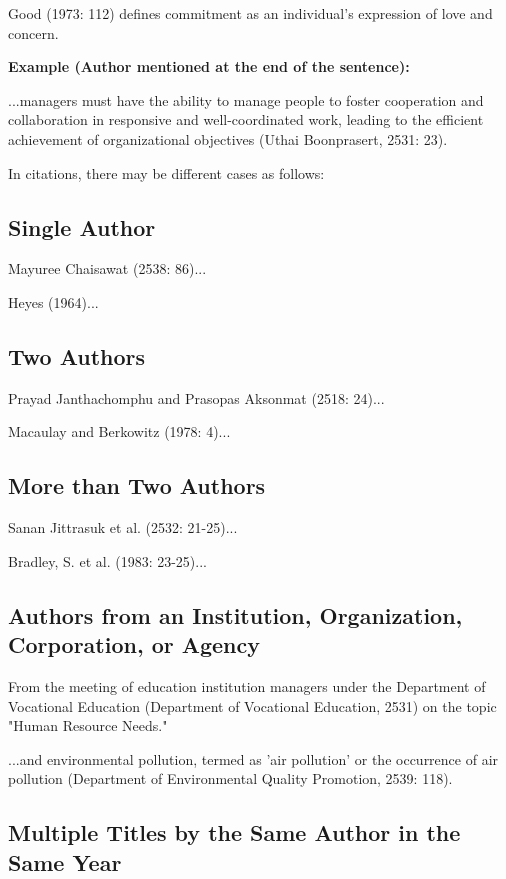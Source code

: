 Good (1973: 112) defines commitment as an individual's expression of love and concern.

\textbf{Example (Author mentioned at the end of the sentence):}

...managers must have the ability to manage people to foster cooperation and collaboration in responsive and well-coordinated work, leading to the efficient achievement of organizational objectives (Uthai Boonprasert, 2531: 23).

In citations, there may be different cases as follows:

\subsection{Single Author}

Mayuree Chaisawat (2538: 86)...

Heyes (1964)...

\subsection{Two Authors}

Prayad Janthachomphu and Prasopas Aksonmat (2518: 24)...

Macaulay and Berkowitz (1978: 4)...

\subsection{More than Two Authors}

Sanan Jittrasuk et al. (2532: 21-25)...

Bradley, S. et al. (1983: 23-25)...

\subsection{Authors from an Institution, Organization, Corporation, or Agency}

From the meeting of education institution managers under the Department of Vocational Education (Department of Vocational Education, 2531) on the topic "Human Resource Needs."

...and environmental pollution, termed as 'air pollution' or the occurrence of air pollution (Department of Environmental Quality Promotion, 2539: 118).

\subsection{Multiple Titles by the Same Author in the Same Year}

